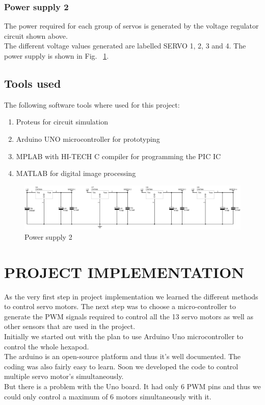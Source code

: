 \documentclass{report}
\begin{document}
\subsection{Power supply 2}
The power required for each group of servos is generated by the voltage regulator circuit shown above.\\
The different voltage values generated are labelled SERVO 1, 2, 3 and 4. The power supply is shown in Fig. ~\ref{fig214}.
\section{Tools used}
The following software tools where used for this project:
\begin{enumerate}
\item	Proteus for circuit simulation
\item	Arduino UNO microcontroller for prototyping
\item	MPLAB with HI-TECH C compiler for programming the PIC IC
\item	MATLAB  for digital image processing
\end{enumerate}
\begin{figure}[h!]
\centering
\includegraphics[scale=0.15,angle=90]{circpwrsupply2}
\caption{Power supply 2}
\label{fig214}
\end{figure}

\chapter{PROJECT IMPLEMENTATION}
As the very first step in project implementation we learned the different methods to control servo motors. The next step was to choose a micro-controller to generate the PWM signals required to control all the 13 servo motors as well as other sensors that are used in the project.\\
Initially we started out with the plan to use Arduino Uno microcontroller to control the whole hexapod.\\
The arduino is an open-source platform and thus it's well documented. The coding was also fairly easy to learn. Soon we developed the code to control multiple servo motor's simultaneously.\\
But there is a problem with the Uno board. It had only 6 PWM pins and thus we could only control a maximum of 6 motors simultaneously with it.
\end{document}
